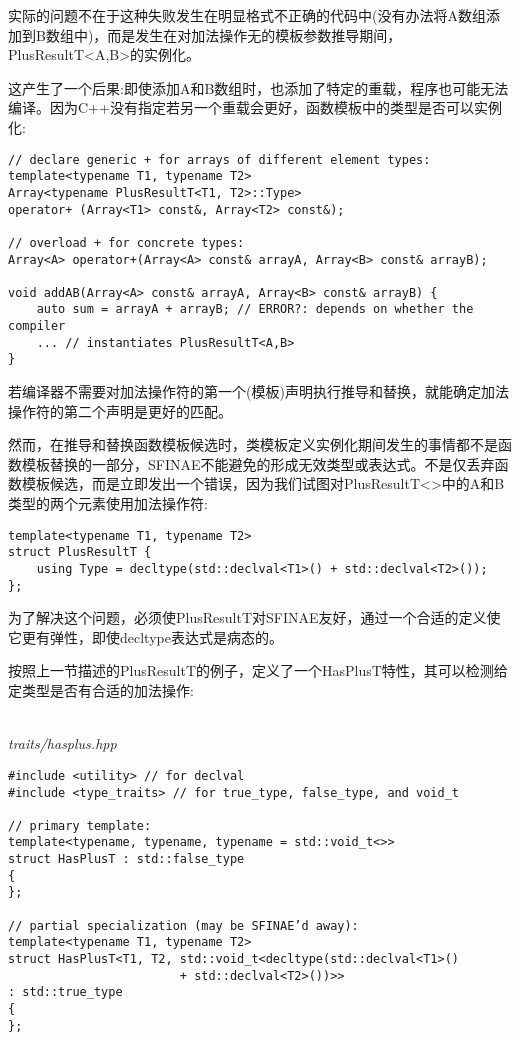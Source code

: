 实际的问题不在于这种失败发生在明显格式不正确的代码中(没有办法将A数组添加到B数组中)，而是发生在对加法操作无的模板参数推导期间，PlusResultT<A,B>的实例化。

这产生了一个后果:即使添加A和B数组时，也添加了特定的重载，程序也可能无法编译。因为C++没有指定若另一个重载会更好，函数模板中的类型是否可以实例化:

\begin{lstlisting}[style=styleCXX]
// declare generic + for arrays of different element types:
template<typename T1, typename T2>
Array<typename PlusResultT<T1, T2>::Type>
operator+ (Array<T1> const&, Array<T2> const&);

// overload + for concrete types:
Array<A> operator+(Array<A> const& arrayA, Array<B> const& arrayB);

void addAB(Array<A> const& arrayA, Array<B> const& arrayB) {
	auto sum = arrayA + arrayB; // ERROR?: depends on whether the compiler
	... // instantiates PlusResultT<A,B>
}
\end{lstlisting}

若编译器不需要对加法操作符的第一个(模板)声明执行推导和替换，就能确定加法操作符的第二个声明是更好的匹配。

然而，在推导和替换函数模板候选时，类模板定义实例化期间发生的事情都不是函数模板替换的一部分，SFINAE不能避免的形成无效类型或表达式。不是仅丢弃函数模板候选，而是立即发出一个错误，因为我们试图对PlusResultT<>中的A和B类型的两个元素使用加法操作符:

\begin{lstlisting}[style=styleCXX]
template<typename T1, typename T2>
struct PlusResultT {
	using Type = decltype(std::declval<T1>() + std::declval<T2>());
};
\end{lstlisting}

为了解决这个问题，必须使PlusResultT对SFINAE友好，通过一个合适的定义使它更有弹性，即使decltype表达式是病态的。

按照上一节描述的PlusResultT的例子，定义了一个HasPlusT特性，其可以检测给定类型是否有合适的加法操作:

\hspace*{\fill} \\ %
\noindent
\textit{traits/hasplus.hpp}
\begin{lstlisting}[style=styleCXX]
#include <utility> // for declval
#include <type_traits> // for true_type, false_type, and void_t

// primary template:
template<typename, typename, typename = std::void_t<>>
struct HasPlusT : std::false_type
{
};

// partial specialization (may be SFINAE’d away):
template<typename T1, typename T2>
struct HasPlusT<T1, T2, std::void_t<decltype(std::declval<T1>()
						+ std::declval<T2>())>>
: std::true_type
{
};
\end{lstlisting}

